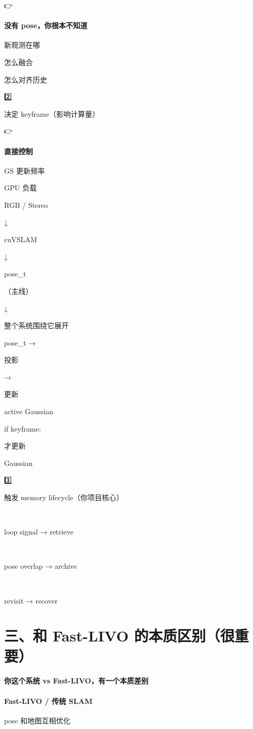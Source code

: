 \documentclass[12pt]{article}
\begin{document}
👉

\paragraph{没有 pose，你根本不知道}
新观测在哪

怎么融合

怎么对齐历史

2️⃣

决定 keyframe（影响计算量）

👉

\paragraph{直接控制}
GS 更新频率

GPU 负载

RGB / Stereo

↓

cuVSLAM

↓

pose\_t

（主线）

↓

整个系统围绕它展开

pose\_t →

投影

→

更新

active Gaussian

if keyframe:

才更新

Gaussian

3️⃣

触发 memory lifecycle（你项目核心）

🔁

loop signal → retrieve

🧠

pose overlap → archive

🔄

revisit → recover

\section{三、和 Fast-LIVO 的本质区别（很重要）}
\paragraph{你这个系统 vs Fast-LIVO，有一个本质差别}
\paragraph{Fast-LIVO / 传统 SLAM}
pose 和地图互相优化
\end{document}
